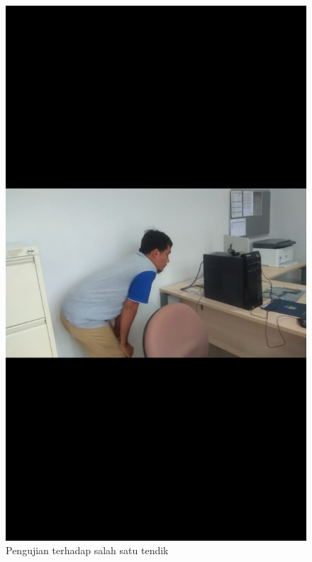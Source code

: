 \begin{figure} [p] \centering
    \includegraphics[scale=0.2]{gambar/masaris.jpeg}
    \caption{Pengujian terhadap salah satu tendik}
    \label{fig:SfMasaris}    
\end{figure}

